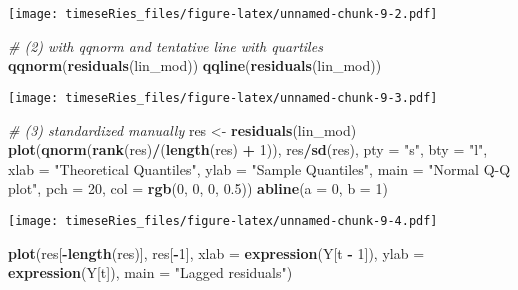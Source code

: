 \documentclass[]{book}
\newenvironment{Shaded}{\begin{snugshade}}{\end{snugshade}}
\newcommand{\CommentTok}[1]{\textcolor[rgb]{0.56,0.35,0.01}{\textit{#1}}}
\newcommand{\DataTypeTok}[1]{\textcolor[rgb]{0.13,0.29,0.53}{#1}}
\newcommand{\DecValTok}[1]{\textcolor[rgb]{0.00,0.00,0.81}{#1}}
\newcommand{\FloatTok}[1]{\textcolor[rgb]{0.00,0.00,0.81}{#1}}
\newcommand{\KeywordTok}[1]{\textcolor[rgb]{0.13,0.29,0.53}{\textbf{#1}}}
\newcommand{\NormalTok}[1]{#1}
\newcommand{\OperatorTok}[1]{\textcolor[rgb]{0.81,0.36,0.00}{\textbf{#1}}}
\newcommand{\StringTok}[1]{\textcolor[rgb]{0.31,0.60,0.02}{#1}}
\begin{document}
\texttt{[image: timeseRies\_files/figure-latex/unnamed-chunk-9-2.pdf]}

\begin{Shaded}
\begin{Highlighting}[]
\CommentTok{# (2) with qqnorm and tentative line with quartiles}
\KeywordTok{qqnorm}\NormalTok{(}\KeywordTok{residuals}\NormalTok{(lin_mod))}
\KeywordTok{qqline}\NormalTok{(}\KeywordTok{residuals}\NormalTok{(lin_mod))}
\end{Highlighting}
\end{Shaded}

\texttt{[image: timeseRies\_files/figure-latex/unnamed-chunk-9-3.pdf]}

\begin{Shaded}
\begin{Highlighting}[]
\CommentTok{# (3) standardized manually}
\NormalTok{res <-}\StringTok{ }\KeywordTok{residuals}\NormalTok{(lin_mod)}
\KeywordTok{plot}\NormalTok{(}\KeywordTok{qnorm}\NormalTok{(}\KeywordTok{rank}\NormalTok{(res)}\OperatorTok{/}\NormalTok{(}\KeywordTok{length}\NormalTok{(res) }\OperatorTok{+}\StringTok{ }\DecValTok{1}\NormalTok{)), res}\OperatorTok{/}\KeywordTok{sd}\NormalTok{(res), }\DataTypeTok{pty =} \StringTok{"s"}\NormalTok{, }\DataTypeTok{bty =} \StringTok{"l"}\NormalTok{, }
    \DataTypeTok{xlab =} \StringTok{"Theoretical Quantiles"}\NormalTok{, }\DataTypeTok{ylab =} \StringTok{"Sample Quantiles"}\NormalTok{, }\DataTypeTok{main =} \StringTok{"Normal Q-Q plot"}\NormalTok{, }
    \DataTypeTok{pch =} \DecValTok{20}\NormalTok{, }\DataTypeTok{col =} \KeywordTok{rgb}\NormalTok{(}\DecValTok{0}\NormalTok{, }\DecValTok{0}\NormalTok{, }\DecValTok{0}\NormalTok{, }\FloatTok{0.5}\NormalTok{))}
\KeywordTok{abline}\NormalTok{(}\DataTypeTok{a =} \DecValTok{0}\NormalTok{, }\DataTypeTok{b =} \DecValTok{1}\NormalTok{)}
\end{Highlighting}
\end{Shaded}

\texttt{[image: timeseRies\_files/figure-latex/unnamed-chunk-9-4.pdf]}

\begin{Shaded}
\begin{Highlighting}[]
\KeywordTok{plot}\NormalTok{(res[}\OperatorTok{-}\KeywordTok{length}\NormalTok{(res)], res[}\OperatorTok{-}\DecValTok{1}\NormalTok{], }\DataTypeTok{xlab =} \KeywordTok{expression}\NormalTok{(Y[t }\OperatorTok{-}\StringTok{ }\DecValTok{1}\NormalTok{]), }\DataTypeTok{ylab =} \KeywordTok{expression}\NormalTok{(Y[t]), }
    \DataTypeTok{main =} \StringTok{"Lagged residuals"}\NormalTok{)}
\end{Highlighting}
\end{Shaded}
\end{document}
